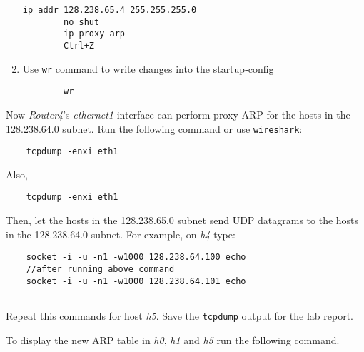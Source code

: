 \documentclass{UTNetLab}
\begin{document}
\begin{enumerate}
        \begin{lstlisting}[language={cisco}, escapechar={@}, emph={x}]
        ip addr 128.238.65.4 255.255.255.0
        no shut
        ip proxy-arp
        Ctrl+Z
        \end{lstlisting}

        \item Use \lstinline{wr} command to write changes into the startup-config

        \begin{lstlisting}
        wr
        \end{lstlisting}
        
    \end{enumerate}
    Now \textit{Router4}’s \textit{ethernet1} interface can perform proxy ARP for the hosts in the 128.238.64.0 subnet. Run the following command or use \lstinline{wireshark}: 
       
    \begin{lstlisting}
    tcpdump -enxi eth1
    \end{lstlisting}
    Also,  
    
    \begin{lstlisting}
    tcpdump -enxi eth1
    \end{lstlisting}

    Then, let the hosts in the 128.238.65.0 subnet send UDP datagrams to the hosts in the 128.238.64.0 subnet.
    For example, on \textit{h4} type:
    
    \begin{lstlisting}
    socket -i -u -n1 -w1000 128.238.64.100 echo
    //after running above command
    socket -i -u -n1 -w1000 128.238.64.101 echo
   
    \end{lstlisting}
    Repeat this commands for host \textit{h5}. Save the \lstinline{tcpdump} output for the lab report.
    
    To display the new ARP table in \textit{h0}, \textit{h1} and \textit{h5} run the following command.
    
\end{document}
